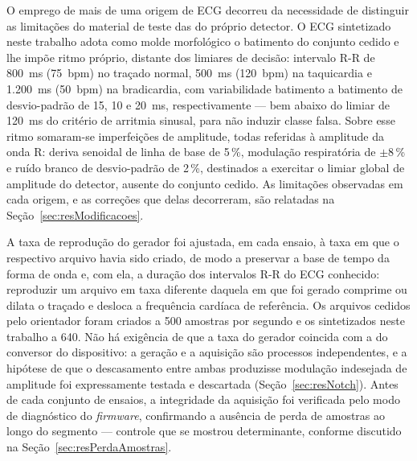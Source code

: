 O emprego de mais de uma origem de \acs{ECG} decorreu da necessidade de distinguir as limitações do material de teste das do próprio detector. O \acs{ECG} sintetizado neste trabalho adota como molde morfológico o batimento do conjunto cedido e lhe impõe ritmo próprio, distante dos limiares de decisão: intervalo R-R de 800~ms (75~bpm) no traçado normal, 500~ms (120~bpm) na taquicardia e 1.200~ms (50~bpm) na bradicardia, com variabilidade batimento a batimento de desvio-padrão de 15, 10 e 20~ms, respectivamente --- bem abaixo do limiar de 120~ms do critério de arritmia sinusal, para não induzir classe falsa. Sobre esse ritmo somaram-se imperfeições de amplitude, todas referidas à amplitude da onda R: deriva senoidal de linha de base de 5\,\%, modulação respiratória de $\pm$8\,\% e ruído branco de desvio-padrão de 2\,\%, destinados a exercitar o limiar global de amplitude do detector, ausente do conjunto cedido. As limitações observadas em cada origem, e as correções que delas decorreram, são relatadas na Seção~\ref{sec:resModificacoes}.


A taxa de reprodução do gerador foi ajustada, em cada ensaio, à taxa em que o respectivo arquivo havia sido criado, de modo a preservar a base de tempo da forma de onda e, com ela, a duração dos intervalos R-R do \acs{ECG} conhecido: reproduzir um arquivo em taxa diferente daquela em que foi gerado comprime ou dilata o traçado e desloca a frequência cardíaca de referência. Os arquivos cedidos pelo orientador foram criados a 500 amostras por segundo e os sintetizados neste trabalho a 640. Não há exigência de que a taxa do gerador coincida com a do conversor do dispositivo: a geração e a aquisição são processos independentes, e a hipótese de que o descasamento entre ambas produzisse modulação indesejada de amplitude foi expressamente testada e descartada (Seção~\ref{sec:resNotch}). Antes de cada conjunto de ensaios, a integridade da aquisição foi verificada pelo modo de diagnóstico do \textit{firmware}, confirmando a ausência de perda de amostras ao longo do segmento --- controle que se mostrou determinante, conforme discutido na Seção~\ref{sec:resPerdaAmostras}.

